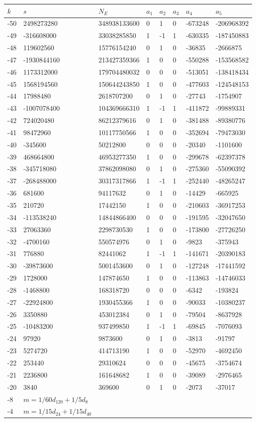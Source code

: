 \documentclass{amsart}
\begin{document}
\begin{longtable}{|l|l|l|lllll|}
\hline
$k$ & $s$ & $N_E$ & $a_1$ & $a_2$ & $a_3$ & $a_4$ & $a_5$\\
\hline
-50&2498273280&348938133600&0&1&0&-673248&-206968392\\
-49&-316608000&33038285850&1&-1&1&-630335&-187450883\\
-48&119602560&15776154240&0&1&0&-36835&-2666875\\
-47&-1930844160&213427359366&1&0&0&-550288&-153568582\\
-46&1173312000&179704480032&0&0&0&-513051&-138418434\\
-45&1568194560&150644243850&1&0&0&-477603&-124548153\\
-44&17988480&2618707200&0&1&0&-27743&-1754907\\
-43&-1007078400&104369666310&1&-1&1&-411872&-99889331\\
-42&724020480&86212379616&0&1&0&-381488&-89380776\\
-41&98472960&10117750566&1&0&0&-352694&-79473030\\
-40&-345600&50212800&0&0&0&-20340&-1101600\\
-39&468664800&46953277350&1&0&0&-299678&-62397378\\
-38&-345718080&37862098080&0&1&0&-275360&-55090392\\
-37&-268488000&30317317866&1&-1&1&-252440&-48265247\\
-36&681600&94117632&0&1&0&-14429&-665925\\
-35&210720&17442150&1&0&0&-210603&-36917253\\
-34&-113538240&14844866400&0&0&0&-191595&-32047650\\
-33&27063360&2298730530&1&0&0&-173800&-27726250\\
-32&-4700160&550574976&0&1&0&-9823&-375943\\
-31&776880&82441062&1&-1&1&-141671&-20390183\\
-30&-39873600&5001453600&0&1&0&-127248&-17441592\\
-29&1728000&147874650&1&0&0&-113863&-14746033\\
-28&-1468800&168318720&0&0&0&-6342&-193824\\
-27&-22924800&1930455366&1&0&0&-90033&-10380237\\
-26&3350880&453012384&0&1&0&-79504&-8637928\\
-25&-10483200&937499850&1&-1&1&-69845&-7076093\\
-24&97920&9873600&0&1&0&-3813&-91797\\
-23&5274720&414713190&1&0&0&-52970&-4692450\\
-22&253440&29310624&0&0&0&-45675&-3754674\\
-21&2236800&161648682&1&0&0&-39089&-2976465\\
-20&3840&369600&0&1&0&-2073&-37017\\
-8&$m=1/60d_{120}+1/5d_{8}$&&\multicolumn{5}{c|}{}\\
-4&$m=1/15d_{24}+1/15d_{40}$&&\multicolumn{5}{c|}{}\\
\hline
\end{longtable}
\end{document}
